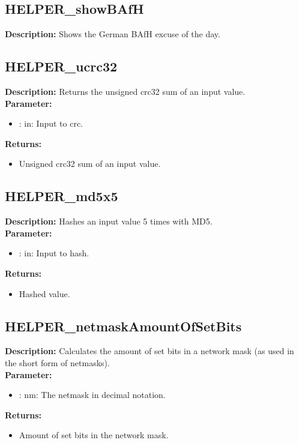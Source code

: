 \subsection{HELPER\_showBAfH}
\textbf{Description:} Shows the German BAfH excuse of the day.\\

\subsection{HELPER\_ucrc32}
\textbf{Description:} Returns the unsigned crc32 sum of an input value.\\
\textbf{Parameter:}
\begin{itemize}
\item : in: Input to crc.
\end{itemize}
\textbf{Returns:}
\begin{itemize}
\item Unsigned crc32 sum of an input value.
\end{itemize}

\subsection{HELPER\_md5x5}
\textbf{Description:} Hashes an input value 5 times with MD5.\\
\textbf{Parameter:}
\begin{itemize}
\item : in: Input to hash.
\end{itemize}
\textbf{Returns:}
\begin{itemize}
\item Hashed value.
\end{itemize}

\subsection{HELPER\_netmaskAmountOfSetBits}
\textbf{Description:} Calculates the amount of set bits in a network mask (as used in the short form of netmasks).\\
\textbf{Parameter:}
\begin{itemize}
\item : nm: The netmask in decimal notation.
\end{itemize}
\textbf{Returns:}
\begin{itemize}
\item Amount of set bits in the network mask.
\end{itemize}

